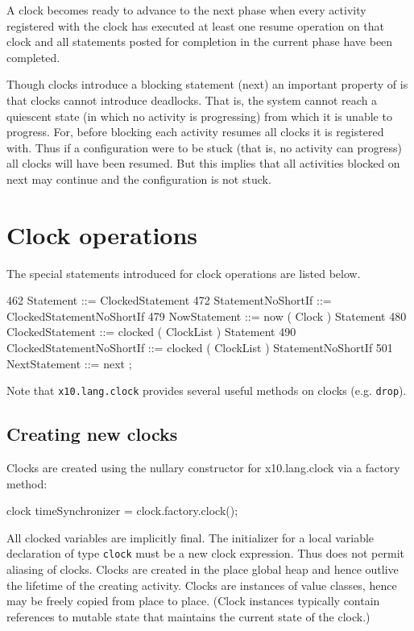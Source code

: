 A clock becomes ready to advance to the next phase when every activity
registered with the clock has executed at least one {\cf resume}
operation on that clock and all statements posted for completion in
the current phase have been completed.

Though clocks introduce a blocking statement ({\cf next}) an important
property of \Xten{} is that clocks cannot introduce deadlocks. That is,
the system cannot reach a quiescent state (in which no activity is
progressing) from which it is unable to progress. For, before blocking
each activity resumes all clocks it is registered with. Thus if a
configuration were to be stuck (that is, no activity can progress) all
clocks will have been resumed. But this implies that all activities
blocked on {\cf next} may continue and the configuration is not stuck.

\section{Clock operations}
The special statements introduced for clock operations are listed below.
\begin{x10}
462 Statement ::= ClockedStatement
472 StatementNoShortIf ::= 
      ClockedStatementNoShortIf
479 NowStatement ::= 
      now ( Clock ) Statement
480 ClockedStatement ::= 
      clocked ( ClockList ) Statement
490 ClockedStatementNoShortIf ::= 
      clocked ( ClockList ) 
         StatementNoShortIf
501 NextStatement ::= next ;
\end{x10}

Note that {\tt x10.lang.clock} provides several useful methods on
clocks (e.g. {\tt drop}).

\subsection{Creating new clocks}
Clocks are created using the nullary constructor for {\cf
x10.lang.clock} via a factory method:

\begin{x10}
clock timeSynchronizer = clock.factory.clock();
\end{x10}

All clocked variables are implicitly final. The initializer for a
local variable declaration of type {\tt clock} must be a new clock
expression. Thus \Xten{} does not permit aliasing of clocks.
Clocks are created in the place global heap and hence outlive the
lifetime of the creating activity.  Clocks are instances of value
classes, hence may be freely copied from place to
place. (Clock instances typically contain references to mutable state
that maintains the current state of the clock.)

